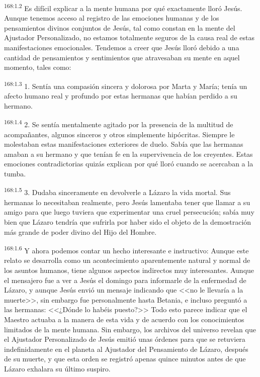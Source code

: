 \par 
\textsuperscript{168:1.2} Es difícil explicar a la mente humana por qué exactamente lloró Jesús. Aunque tenemos acceso al registro de las emociones humanas y de los pensamientos divinos conjuntos de Jesús, tal como constan en la mente del Ajustador Personalizado, no estamos totalmente seguros de la causa real de estas manifestaciones emocionales. Tendemos a creer que Jesús lloró debido a una cantidad de pensamientos y sentimientos que atravesaban su mente en aquel momento, tales como:

\par 
\textsuperscript{168:1.3} 1. Sentía una compasión sincera y dolorosa por Marta y María; tenía un afecto humano real y profundo por estas hermanas que habían perdido a su hermano.

\par 
\textsuperscript{168:1.4} 2. Se sentía mentalmente agitado por la presencia de la multitud de acompañantes, algunos sinceros y otros simplemente hipócritas. Siempre le molestaban estas manifestaciones exteriores de duelo. Sabía que las hermanas amaban a su hermano y que tenían fe en la supervivencia de los creyentes. Estas emociones contradictorias quizás explican por qué lloró cuando se acercaban a la tumba.

\par 
\textsuperscript{168:1.5} 3. Dudaba sinceramente en devolverle a Lázaro la vida mortal. Sus hermanas lo necesitaban realmente, pero Jesús lamentaba tener que llamar a su amigo para que luego tuviera que experimentar una cruel persecución; sabía muy bien que Lázaro tendría que sufrirla por haber sido el objeto de la demostración más grande de poder divino del Hijo del Hombre.

\par 
\textsuperscript{168:1.6} Y ahora podemos contar un hecho interesante e instructivo: Aunque este relato se desarrolla como un acontecimiento aparentemente natural y normal de los asuntos humanos, tiene algunos aspectos indirectos muy interesantes. Aunque el mensajero fue a ver a Jesús el domingo para informarle de la enfermedad de Lázaro, y aunque Jesús envió un mensaje indicando que <<no le llevaría a la muerte>>, sin embargo fue personalmente hasta Betania, e incluso preguntó a las hermanas: <<¿Dónde lo habéis puesto?>> Todo esto parece indicar que el Maestro actuaba a la manera de esta vida y de acuerdo con los conocimientos limitados de la mente humana. Sin embargo, los archivos del universo revelan que el Ajustador Personalizado de Jesús emitió unas órdenes para que se retuviera indefinidamente en el planeta al Ajustador del Pensamiento de Lázaro, después de su muerte, y que esta orden se registró apenas quince minutos antes de que Lázaro exhalara su último suspiro.

